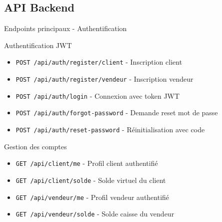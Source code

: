 \documentclass[aspectratio=169,9pt,demo]{beamer}
\begin{document}
\subsection{\large API Backend}
\begin{frame}{Endpoints principaux - Authentification}
\begin{block}{Authentification JWT}
\begin{itemize}
    \item \texttt{POST /api/auth/register/client} - Inscription client
    \item \texttt{POST /api/auth/register/vendeur} - Inscription vendeur  
    \item \texttt{POST /api/auth/login} - Connexion avec token JWT
    \item \texttt{POST /api/auth/forgot-password} - Demande reset mot de passe
    \item \texttt{POST /api/auth/reset-password} - Réinitialisation avec code
\end{itemize}
\end{block}

\begin{block}{Gestion des comptes}
\begin{itemize}
    \item \texttt{GET /api/client/me} - Profil client authentifié
    \item \texttt{GET /api/client/solde} - Solde virtuel du client
    \item \texttt{GET /api/vendeur/me} - Profil vendeur authentifié
    \item \texttt{GET /api/vendeur/solde} - Solde caisse du vendeur
\end{itemize}
\end{block}
\end{frame}
\end{document}
